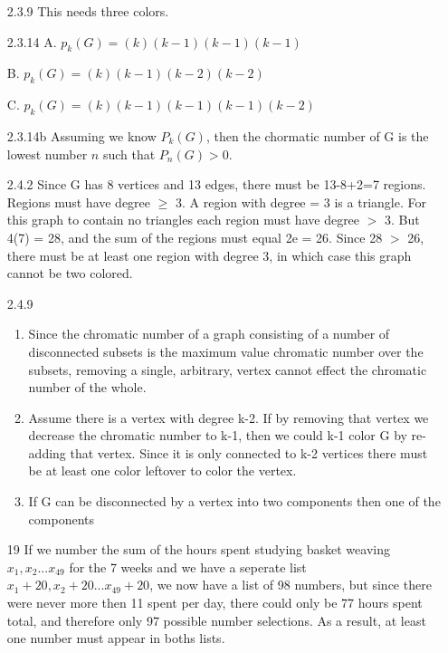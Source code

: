 \documentclass{article}
\begin{document}
\begin{enumerate}
\item[2.3.9]
This needs three colors. 

\item[2.3.14]
A. $p_k(G) = (k)(k-1)(k-1)(k-1)$

B. $p_k(G) = (k)(k-1)(k-2)(k-2)$

C. $p_k(G) = (k)(k-1)(k-1)(k-1)(k-2)$

\item[2.3.14b]
Assuming we know $P_k(G)$, then the chormatic number of G is the lowest number $n$ such that $P_n(G) > 0$. 

\item[2.4.2]
Since G has 8 vertices and 13 edges, there must be 13-8+2=7 regions. Regions must have degree $\ge$ 3. A region with degree = 3 is a triangle. For this graph to contain no triangles each region must have degree $>$ 3. But 4(7) = 28, and the sum of the regions must equal 2e = 26. Since 28 $>$ 26, there must be at least one region with degree 3, in which case this graph cannot be two colored. 

\item[2.4.9]
\begin{enumerate}
\item
Since the chromatic number of a graph consisting of a number of disconnected subsets is the maximum value chromatic number over the subsets, removing a single, arbitrary, vertex cannot effect the chromatic number of the whole.
\item
Assume there is a vertex with degree k-2. If by removing that vertex we decrease the chromatic number to k-1, then we could k-1 color G by re-adding that vertex. Since it is only connected to k-2 vertices there must be at least one color leftover to color the vertex.  
\item
If G can be disconnected by a vertex into two components then one of the components 

\end{enumerate}

\item[19]
If we number the sum of the hours spent studying basket weaving $x_1, x_2 ... x_49$ for the 7 weeks and we have a seperate list $x_1+20, x_2+20 ... x_49+20$, we now have a list of 98 numbers, but since there were never more then 11 spent per day, there could only be 77 hours spent total, and therefore only 97 possible number selections. As a result, at least one number must appear in boths lists. 
\end{enumerate}
\end{document}
